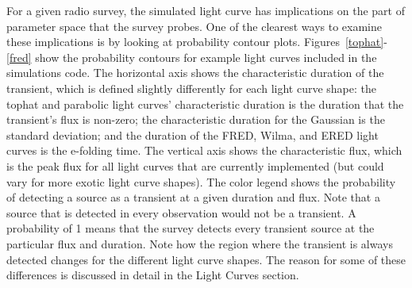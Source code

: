 \documentclass[12pt]{article}
\begin{document}
For a given radio survey, the simulated light curve has implications on the part of parameter space that the survey probes. One of the clearest ways to examine these implications is by looking at probability contour plots. Figures~\ref{tophat}-\ref{fred} show the probability contours for example light curves included in the simulations code. The horizontal axis shows the characteristic duration of the transient, which is defined slightly differently for each light curve shape: the tophat and parabolic light curves' characteristic duration is the duration that the transient's flux is non-zero; the characteristic duration for the Gaussian is the standard deviation; and the duration of the FRED, Wilma, and ERED light curves is the e-folding time. The vertical axis shows the characteristic flux, which is the peak flux for all light curves that are currently implemented (but could vary for more exotic light curve shapes). The color legend shows the probability of detecting a source as a transient at a given duration and flux. Note that a source that is detected in every observation would not be a transient. A probability of 1 means that the survey detects every transient source at the particular flux and duration. Note how the region where the transient is always detected changes for the different light curve shapes. The reason for some of these differences is discussed in detail in the Light Curves section.
\end{document}
